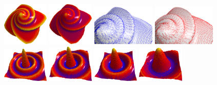 \documentclass{llncs}
\begin{document}
\begin{figure}
  \vspace{-0.35cm}
  \begin{center}
    {\includegraphics[width=2.2cm]{figs/Octa_mean}}
    {\includegraphics[width=2.2cm]{figs/Octa_gaussian}}
    {\includegraphics[height=2.0cm]{figs/Octa_dir_min_zoom}}
    {\includegraphics[height=2.0cm]{figs/Octa_dir_max_zoom}}\\
    {\includegraphics[width=2.2cm]{figs/function_mean_0}}
    {\includegraphics[width=2.2cm]{figs/function_mean_1}}
    {\includegraphics[width=2.2cm]{figs/function_mean_2}}
    {\includegraphics[width=2.2cm]{figs/function_mean_3}}

\end{center}
\end{figure}
\end{document}
